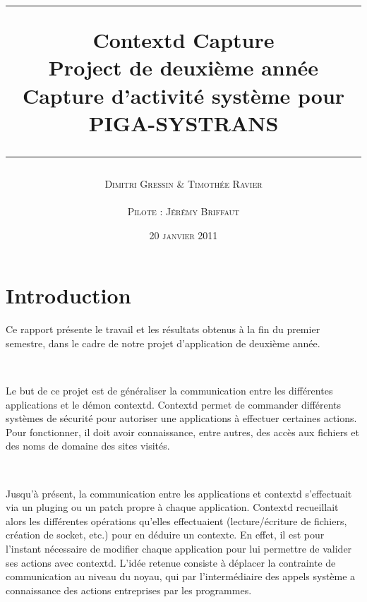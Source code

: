 \documentclass[pdftex,a4paper,titlepage,11pt,openright]{article}
\newcommand{\nom}[1]{\textsc{#1}}
\newcommand{\ligne}[1][1pt]{
  \par\noindent
  \rule[.5ex]{\linewidth}{#1}\par}
\newcommand{\clearemptydoublepage}{
	\newpage{\pagestyle{empty}\cleardoublepage}}
\begin{document}
\setlength{\parskip}{2.4ex}

\title{
\ligne{\Large}
\textbf{Contextd Capture}\\
\textbf{Project de deuxième année}\\
\Large Capture d'activité système pour PIGA-SYSTRANS
\ligne{\Large}
}
\author{\nom{Dimitri Gressin} \& \nom{Timothée Ravier}\\\\\nom{Pilote : Jérémy Briffaut}}
\date{20 \textsc{janvier} 2011} %

\maketitle

\clearemptydoublepage

\setcounter{secnumdepth}{2}
\setcounter{tocdepth}{2}
\tableofcontents
\addtocounter{page}{-1}

\newpage

\section*{Introduction} 
Ce rapport présente le travail et les résultats obtenus à la fin du premier semestre, dans le cadre de notre projet d'application de deuxième année.

~

Le but de ce projet est de généraliser la communication entre les différentes applications et le démon contextd. Contextd permet de commander différents systèmes de sécurité pour autoriser une applications à effectuer certaines actions.
Pour fonctionner, il doit avoir connaissance, entre autres, des accès aux fichiers et des noms de domaine des sites visités.

~

Jusqu'à présent, la communication entre les applications et contextd s'effectuait via un pluging ou un patch propre à chaque application. Contextd recueillait alors les différentes opérations qu'elles effectuaient (lecture/écriture de fichiers, création de socket, etc.) pour en déduire un contexte. En effet, il est pour l'instant nécessaire de modifier chaque application pour lui permettre de valider ses actions avec contextd. L'idée retenue consiste à déplacer la contrainte de communication au niveau du noyau, qui par l'intermédiaire des appels système a connaissance des actions entreprises par les programmes.
\end{document}
